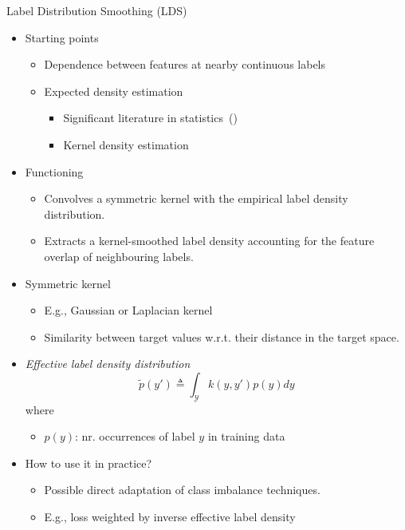 \begin{frame}[shrink=3]{Label Distribution Smoothing (LDS)}
	\begin{itemize}\setlength\itemsep{.5em}
		\item  Starting points
		\begin{itemize}
			\item Dependence between features at nearby continuous labels
			\item Expected density estimation
			\begin{itemize}
				\item Significant literature in statistics~(\cite{parzen1962estimation})
				\item Kernel density estimation
			\end{itemize}
		\end{itemize}
		\item Functioning
		\begin{itemize}
			\item Convolves a symmetric kernel with the empirical label density distribution.
			\item Extracts a kernel-smoothed label density accounting for the feature overlap of neighbouring labels.
		\end{itemize}
		\item Symmetric kernel
		\begin{itemize}
			\item E.g., Gaussian or Laplacian kernel
			\item Similarity between target values w.r.t. their distance in the target space.
		\end{itemize}
		\item \emph{Effective label density distribution}
		\begin{equation*}
			\tilde{p}(y') \triangleq \int_\mathcal{Y} k(y,y')p(y)dy
		\end{equation*}
		where 
		\begin{itemize}
			\item $p(y)$: nr. occurrences of label $y$ in training data
		\end{itemize}
		\item How to use it in practice?
		\begin{itemize}
			\item Possible direct adaptation of class imbalance techniques.
			\item E.g., loss weighted by inverse effective label density
		\end{itemize}
	\end{itemize}
\end{frame}